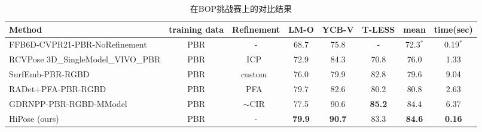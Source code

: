 \begin{sidewaystable}
  \centering
  \begin{tabular}{l|c|c|c|c|c|c|c}
    \toprule
     \textbf{Method} & training data & Refinement & LM-O & YCB-V & T-LESS & mean & time(sec) \\
    \midrule
    FFB6D-CVPR21-PBR-NoRefinement\cite{he2021ffb6d} & PBR &  - & 68.7 &  75.8  & - & 72.3$^*$ & 0.19$^*$\\
    RCVPose 3D\_SingleModel\_VIVO\_PBR\cite{wu2022vote} & PBR &  ICP~\cite{Rusinkiewicz2001EfficientVO} & 72.9 &  84.3  & 70.8 & 76.0 & 1.33\\
    SurfEmb-PBR-RGBD\cite{Haugaard2021SurfEmbDA} & PBR &  custom~\cite{Haugaard2021SurfEmbDA} & 76.0 &  79.9  & 82.8 & 79.6 & 9.04\\
    RADet+PFA-PBR-RGBD\cite{Hai2023RigidityAwareDF} & PBR &  PFA~\cite{hu2022perspective} & 79.7 &  82.6  & 80.2 & 80.8 & 2.63\\
    GDRNPP-PBR-RGBD-MModel\cite{liu2022gdrnpp_bop} & PBR &  $\sim$CIR~\cite{lipson2022coupled} & 77.5 &  90.6  & \textbf{85.2} & 84.4 & 6.37\\
    HiPose (ours) & PBR &  - & \textbf{79.9} &  \textbf{90.7}   & 83.3 & \textbf{84.6} & \textbf{0.16}\\
    \bottomrule
  \end{tabular}
  \caption{在BOP挑战赛上的对比结果}
  \label{tab:bop_score_table}
\end{sidewaystable}



